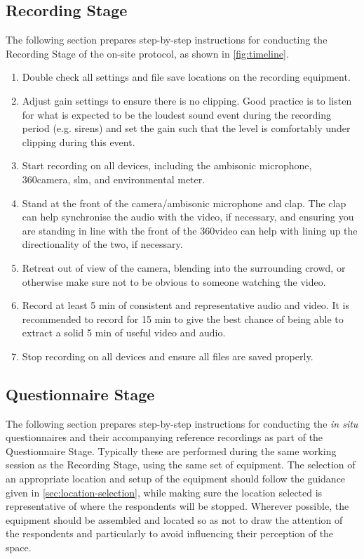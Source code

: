  \subsection{Recording Stage}

   The following section prepares step-by-step instructions for conducting the Recording Stage of the on-site protocol, as shown in \cref{fig:timeline}.

   \begin{enumerate}
     \item Double check all settings and file save locations on the recording equipment.
     \item Adjust gain settings to ensure there is no clipping. Good practice is to listen for what is expected to be the loudest sound event during the recording period (e.g. sirens) and set the gain such that the level is comfortably under clipping during this event.
     \item Start recording on all devices, including the ambisonic microphone, 360\degree camera, \gls{slm}, and environmental meter.
     \item Stand at the front of the camera/ambisonic microphone and clap. The clap can help synchronise the audio with the video, if necessary, and ensuring you are standing in line with the front of the 360\degree video can help with lining up the directionality of the two, if necessary.
     \item Retreat out of view of the camera, blending into the surrounding crowd, or otherwise make sure not to be obvious to someone watching the video.
     \item Record at least 5 min of consistent and representative audio and video. It is recommended to record for 15 min to give the best chance of being able to extract a solid 5 min of useful video and audio.
     \item Stop recording on all devices and ensure all files are saved properly.
   \end{enumerate}

 \subsection{Questionnaire Stage}

   The following section prepares step-by-step instructions for conducting the \textit{in situ} questionnaires and their accompanying reference recordings as part of the Questionnaire Stage. Typically these are performed during the same working session as the Recording Stage, using the same set of equipment. The selection of an appropriate location and setup of the equipment should follow the guidance given in \cref{sec:location-selection}, while making sure the location selected is representative of where the respondents will be stopped. Wherever possible, the equipment should be assembled and located so as not to draw the attention of the respondents and particularly to avoid influencing their perception of the space.

